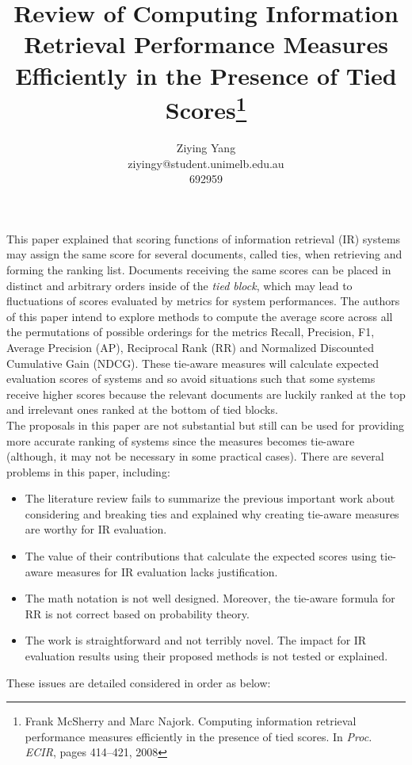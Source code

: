 \documentclass{article}
\title{\Large{\textbf{Review of Computing Information Retrieval Performance
Measures Efficiently in the Presence of Tied
Scores}}\footnote{Frank McSherry and Marc Najork. Computing information retrieval performance measures efficiently in the presence of tied scores. In \textit{Proc. ECIR}, pages 414--421, 2008}} %
\author{Ziying Yang\\\small{ziyingy@student.unimelb.edu.au}\\\small{692959}\\}
\date{}
\begin{document}
\maketitle

This paper explained that scoring functions of information retrieval (IR) systems may assign the same score for several documents, called ties, when retrieving and forming the ranking list. Documents receiving the same scores can be placed in distinct and arbitrary orders inside of the \textit{tied block}, which may lead to fluctuations of scores evaluated by metrics for system performances. The authors of this paper intend to explore methods to compute the average score across all the permutations of possible orderings for the metrics Recall, Precision, F1, Average Precision (AP), Reciprocal Rank (RR) and Normalized Discounted Cumulative Gain (NDCG). These tie-aware measures will calculate expected evaluation scores of systems and so avoid situations such that some systems receive higher scores because the relevant documents are luckily ranked at the top and irrelevant ones ranked at the bottom of tied blocks.\\

The proposals in this paper are not substantial but still can be used for providing more accurate ranking of systems since the measures becomes tie-aware (although, it may not be necessary in some practical cases). There are several problems in this paper, including:

\begin{itemize}
\item The literature review fails to summarize the previous important work about considering and breaking ties and explained why creating tie-aware measures are worthy for IR evaluation.

\item The value of their contributions that calculate the expected scores using tie-aware measures for IR evaluation lacks justification.

\item The math notation is not well designed. Moreover, the tie-aware formula for RR is not correct based on probability theory.

\item The work is straightforward and not terribly novel. The impact for IR evaluation results using their proposed methods is not tested or explained.
\end{itemize}
These issues are detailed considered in order as below:
\end{document}
